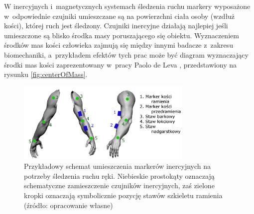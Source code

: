 W inercyjnych i~magnetycznych systemach śledzenia ruchu markery wyposażone w~odpowiednie czujniki umieszczane są na powierzchni ciała osoby (wzdłuż kości), której ruch jest śledzony. Czujniki inercyjne działają najlepiej jeśli umieszczone są blisko środka masy poruszającego się obiektu. Wyznaczeniem środków mas kości człowieka zajmują się między innymi badacze z~zakresu biomechaniki, a~przykładem efektów tych prac może być diagram wyznaczający środki mas kości zaprezentowany w~pracy Paolo de Leva \cite{DeLeva1996}, przedstawiony na rysunku \ref{fig:centerOfMass}.
																					
\begin{savenotes}
	\begin{figure}[!htb]
		\centering	
		\includegraphics[width=0.75\textwidth]{images/imuArm.png}
		\caption[Przykładowy schemat umieszczenia markerów inercyjnych na potrzeby śledzenia ruchu ręki]{Przykładowy schemat umieszczenia markerów inercyjnych na potrzeby śledzenia ruchu ręki. Niebieskie prostokąty oznaczają schematyczne zamieszczenie czujników inercyjnych, zaś zielone kropki oznaczają symbolicznie pozycję stawów szkieletu ramienia (źródło: opracowanie własne)}
		\label{fig:literature:imuMarkerPlacementSample}
	\end{figure}
\end{savenotes}
																							
